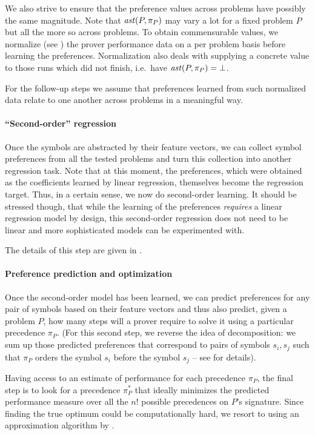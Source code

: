 We also strive to ensure that the preference values across problems have possibly the same magnitude.
Note that \(\operatorname{\mathit{ast}}(P,\pi_P)\) may vary a lot for a fixed problem \(P\) but all the more so across
problems. To obtain commensurable values, we normalize
(see ) the prover performance data
on a per problem basis before learning the preferences. Normalization also deals with
supplying a concrete value to those runs which did not finish, i.e.~have \(\operatorname{\mathit{ast}}(P,\pi_P) = \bot\).

For the follow-up steps we assume that preferences learned from such normalized data relate to one another
across problems in a meaningful way.

\paragraph{``Second-order'' regression}
Once the symbols are abstracted by their feature vectors, we can collect symbol preferences from all the tested problems
and turn this collection into another regression task. 
Note that at this moment, the preferences, which were obtained as the coefficients learned by linear regression,
themselves become the regression target. Thus, in a certain sense, we now do second-order learning.
It should be stressed though, that while the learning of the preferences \emph{requires} a linear regression model by design,
this second-order regression does not need to be linear and more sophisticated models can be experimented with. 

The details of this step are given in .

\paragraph{Preference prediction and optimization} Once the second-order model has been learned, we can predict 
preferences for any pair of symbols based on their feature vectors and thus also predict,
given a problem $P$, how many steps will a prover require to solve it using a particular precedence $\pi_P$.
(For this second step, we reverse the idea of decomposition:
we sum up those predicted preferences that correspond to pairs of symbols $s_i,s_j$
such that $\pi_P$ orders the symbol $s_i$ before the symbol $s_j$ -- see  for details).

Having access to an estimate of performance for each precedence $\pi_P$, the final step 
is to look for a precedence $\pi^*_P$ that ideally minimizes the predicted performance measure 
over all the $n!$ possible precedences on $P$'s signature. Since finding the true
optimum could be computationally hard, we resort to using an approximation algorithm by \citet{Cohen2011}.

